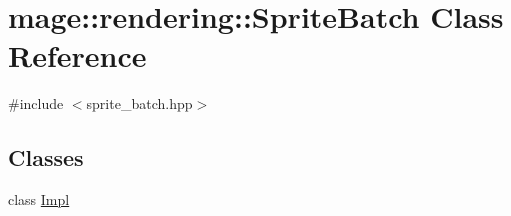 \hypertarget{classmage_1_1rendering_1_1_sprite_batch}{}\section{mage\+:\+:rendering\+:\+:Sprite\+Batch Class Reference}
\label{classmage_1_1rendering_1_1_sprite_batch}


{\ttfamily \#include $<$sprite\+\_\+batch.\+hpp$>$}

\subsection*{Classes}
\begin{DoxyCompactItemize}
\item 
class \hyperlink{classmage_1_1rendering_1_1_sprite_batch_1_1_impl}{Impl}
\end{DoxyCompactItemize}
